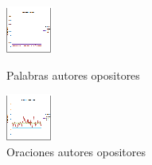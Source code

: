 \documentclass[a4paper,10pt]{article}
\begin{document}
\begin{figure}%
		\begin{minipage}[b]{0.5\linewidth}
		\centering
		\includegraphics[width=\linewidth]{figura3pal_op.eps}
		\caption{Palabras autores opositores}
	\label{fig:figura3}
		\end{minipage}
	\hspace{0.2 cm}
		\begin{minipage}[b]{0.5\linewidth}
		\centering
		\includegraphics[width=\linewidth]{figura4ora_op.eps}
		\caption{Oraciones autores opositores}
		\label{fig:figura4}
	\end{minipage}
	\hspace{0.5cm}
\end{figure}
\end{document}
